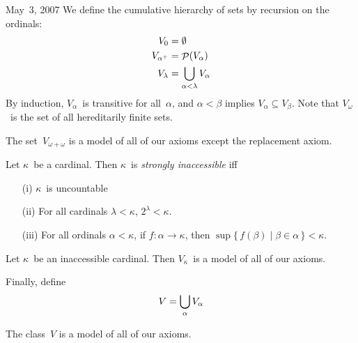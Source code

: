 \begin{lecture}{May~3, 2007}
We define the cumulative hierarchy of sets by recursion on the ordinals:
\begin{align*}
V_0&=\emptyset\\
V_{\alpha^+}&=\mathop{\mathcal{P}}(V_{\alpha})\\
V_{\lambda}&=\bigcup_{\alpha<\lambda}V_{\alpha}
\end{align*}
By induction, \(V_{\alpha}\)~is transitive for all~\(\alpha\), and \(\alpha<\beta\) implies \(V_{\alpha}\subseteq V_{\beta}\). Note that \(V_{\omega}\)~is the set of all hereditarily finite sets.
\begin{thm}
The set~\(V_{\omega+\omega}\) is a model of all of our axioms except the replacement axiom.
\end{thm}
\begin{defn}
Let \(\kappa\)~be a cardinal. Then \(\kappa\)~is \emph{strongly inaccessible} iff
\begin{enumerate}[itemsep=0pt]
\item[(i)] \(\kappa\)~is uncountable
\item[(ii)] For all cardinals \(\lambda<\kappa\), \(2^{\lambda}<\kappa\).
\item[(iii)] For all ordinals \(\alpha<\kappa\), if \(f:\alpha\to\kappa\), then \(\sup\{\,f(\beta)\mid\beta\in\alpha\,\}<\kappa\).
\end{enumerate}
\end{defn}
\begin{thm}
Let \(\kappa\)~be an inaccessible cardinal. Then \(V_{\kappa}\)~is a model of all of our axioms.
\end{thm}
Finally, define
\[V=\bigcup_{\alpha}V_{\alpha}\]
\begin{thm}
The class~\(V\) is a model of all of our axioms.
\end{thm}
\end{lecture}
